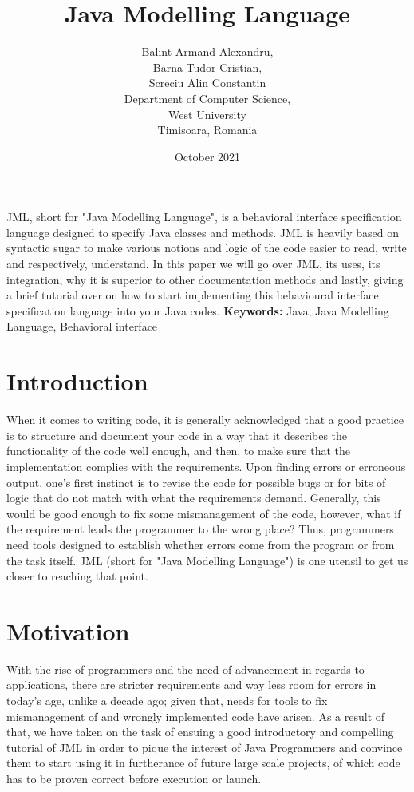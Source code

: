 \documentclass{article}
\title{Java Modelling Language}
\author{Balint Armand Alexandru,\\
Barna Tudor Cristian,\\
Screciu Alin Constantin\\
Department of Computer Science,\\
West University\\
Timisoara, Romania}
\date{October 2021}
\makeatletter
\renewenvironment{abstract}{%
    \if@twocolumn
      \section*{\abstractname}%
    \else %
      \begin{center}%
        {\bfseries \Large\abstractname\vspace{\z@}}%
      \end{center}%
      \quotation
    \fi}
    {\if@twocolumn\else\endquotation\fi}
\makeatother
\begin{document}
\maketitle
\begin{abstract}
\noindent JML, short for "Java Modelling Language", is a behavioral interface specification language designed to specify Java classes and methods. JML is heavily based on syntactic sugar to make various notions and logic of the code easier to read, write and respectively, understand. In this paper we will go over JML, its uses, its integration, why it is superior to other documentation methods and lastly, giving a brief tutorial over on how to start implementing this behavioural interface specification language into your Java codes.
\newline \newline \textbf{Keywords:} \footnotesize Java, Java Modelling Language, Behavioral interface
\end{abstract}




\clearpage
\tableofcontents
\clearpage





\section{Introduction}
When it comes to writing code, it is generally acknowledged that a good practice is to structure and document your code in a way that it describes the functionality of the code well enough, and then, to make sure that the implementation complies with the requirements. Upon finding errors or erroneous output, one's first instinct is to revise the code for possible bugs or for bits of logic that do not match with what the requirements demand. Generally, this would be good enough to fix some mismanagement of the code, however, what if the requirement leads the programmer to the wrong place? Thus, programmers need tools designed to establish whether errors come from the program or from the task itself.  JML (short for "Java Modelling Language") is one utensil to get us closer to reaching that point.

\section{Motivation}
With the rise of programmers and the need of advancement in regards to applications, there are stricter requirements and way less room for errors in today's age, unlike a decade ago; given that, needs for tools to fix mismanagement of and wrongly implemented code have arisen. As a result of that, we have taken on the task of ensuing a good introductory and compelling tutorial of JML in order to pique the interest of Java Programmers and convince them to start using it in furtherance of future large scale projects, of which code has to be proven correct before execution or launch.
\end{document}
